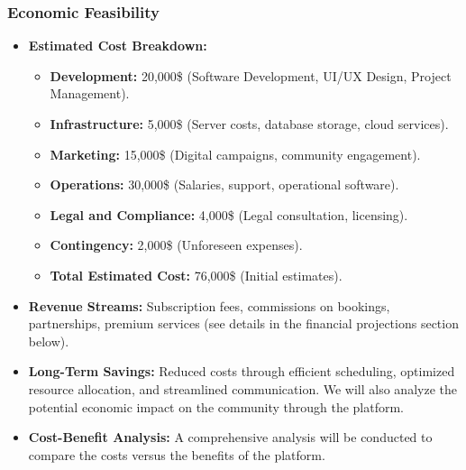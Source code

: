 \documentclass[12pt]{article}
\begin{document}
\subsubsection{Economic Feasibility}
\begin{itemize}
    \item \textbf{Estimated Cost Breakdown:}
    \begin{itemize}
        \item \textbf{Development:} 20,000\$ (Software Development, UI/UX Design, Project Management).
        \item \textbf{Infrastructure:} 5,000\$ (Server costs, database storage, cloud services).
        \item \textbf{Marketing:} 15,000\$ (Digital campaigns, community engagement).
        \item \textbf{Operations:} 30,000\$ (Salaries, support, operational software).
        \item \textbf{Legal and Compliance:} 4,000\$ (Legal consultation, licensing).
         \item \textbf{Contingency:} 2,000\$ (Unforeseen expenses).
        \item \textbf{Total Estimated Cost:} 76,000\$ (Initial estimates).
    \end{itemize}
    \item \textbf{Revenue Streams:} Subscription fees, commissions on bookings, partnerships, premium services (see details in the financial projections section below).
    \item \textbf{Long-Term Savings:} Reduced costs through efficient scheduling, optimized resource allocation, and streamlined communication. We will also analyze the potential economic impact on the community through the platform.
    \item  \textbf{Cost-Benefit Analysis:} A comprehensive analysis will be conducted to compare the costs versus the benefits of the platform.
\end{itemize}
\end{document}
